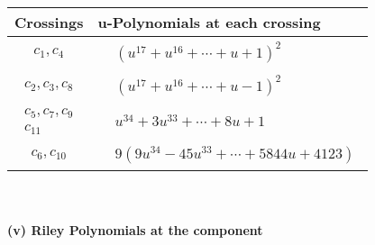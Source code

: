 \documentclass[1p]{elsarticle_modified}
\theoremstyle{definition}
\begin{document}
\begin{tabular}{m{50pt}|m{274pt}}
Crossings & \hspace{64pt}u-Polynomials at each crossing \\
\hline $$\begin{aligned}c_{1},c_{4}\end{aligned}$$&$\begin{aligned}
&(u^{17}+u^{16}+\cdots+u+1)^{2}
\end{aligned}$\\
\hline $$\begin{aligned}c_{2},c_{3},c_{8}\end{aligned}$$&$\begin{aligned}
&(u^{17}+u^{16}+\cdots+u-1)^{2}
\end{aligned}$\\
\hline $$\begin{aligned}c_{5},c_{7},c_{9}\\c_{11}\end{aligned}$$&$\begin{aligned}
&u^{34}+3 u^{33}+\cdots+8 u+1
\end{aligned}$\\
\hline $$\begin{aligned}c_{6},c_{10}\end{aligned}$$&$\begin{aligned}
&9(9 u^{34}-45 u^{33}+\cdots+5844 u+4123)
\end{aligned}$\\
\hline
\end{tabular}\\~\\
\newpage\renewcommand{\arraystretch}{1}
\flushleft \textbf{(v) Riley Polynomials at the component}\newline \\
\end{document}
